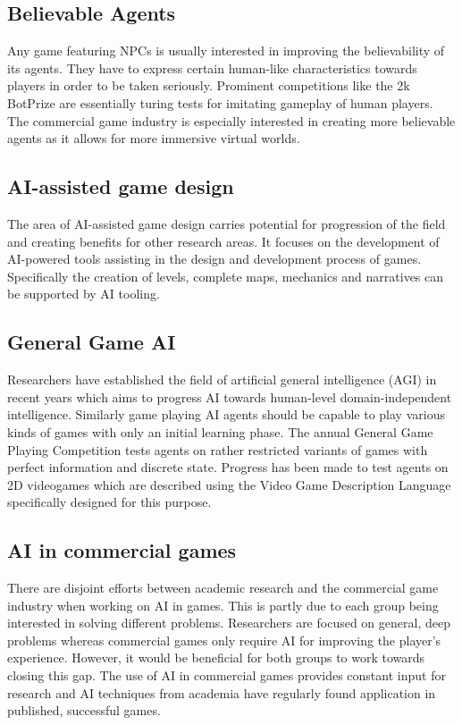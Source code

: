 \subsection{Believable Agents}
Any game featuring NPCs is usually interested in improving the believability of its agents.
They have to express certain human-like characteristics towards players in order to be taken seriously.
Prominent competitions like the 2k BotPrize are essentially turing tests for imitating gameplay of human players.
The commercial game industry is especially interested in creating more believable agents as it allows for more immersive virtual worlds.

\subsection{AI-assisted game design}
The area of AI-assisted game design carries potential for progression of the field and creating benefits for other research areas.
It focuses on the development of AI-powered tools assisting in the design and development process of games.
Specifically the creation of levels, complete maps, mechanics and narratives can be supported by AI tooling.

\subsection{General Game AI}
Researchers have established the field of artificial general intelligence (AGI) in recent years which aims to progress AI towards human-level domain-independent intelligence.
Similarly game playing AI agents should be capable to play various kinds of games with only an initial learning phase.
The annual General Game Playing Competition tests agents on rather restricted variants of games with perfect information and discrete state.
Progress has been made to test agents on 2D videogames which are described using the Video Game Description Language specifically designed for this purpose.

\subsection{AI in commercial games}
There are disjoint efforts between academic research and the commercial game industry when working on AI in games.
This is partly due to each group being interested in solving different problems.
Researchers are focused on general, deep problems whereas commercial games only require AI for improving the player's experience.
However, it would be beneficial for both groups to work towards closing this gap.
The use of AI in commercial games provides constant input for research and AI techniques from academia have regularly found application in published, successful games.